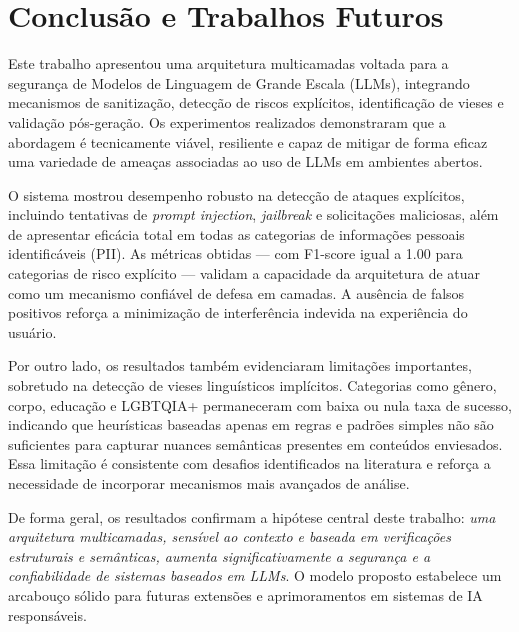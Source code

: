 \section{Conclusão e Trabalhos Futuros}
\label{sec:conclusion}

Este trabalho apresentou uma arquitetura multicamadas voltada para a segurança de Modelos de Linguagem de Grande Escala (LLMs), integrando mecanismos de sanitização, detecção de riscos explícitos, identificação de vieses e validação pós-geração. Os experimentos realizados demonstraram que a abordagem é tecnicamente viável, resiliente e capaz de mitigar de forma eficaz uma variedade de ameaças associadas ao uso de LLMs em ambientes abertos.

O sistema mostrou desempenho robusto na detecção de ataques explícitos, incluindo tentativas de \textit{prompt injection}, \textit{jailbreak} e solicitações maliciosas, além de apresentar eficácia total em todas as categorias de informações pessoais identificáveis (PII). As métricas obtidas — com F1-score igual a 1.00 para categorias de risco explícito — validam a capacidade da arquitetura de atuar como um mecanismo confiável de defesa em camadas. A ausência de falsos positivos reforça a minimização de interferência indevida na experiência do usuário.

Por outro lado, os resultados também evidenciaram limitações importantes, sobretudo na detecção de vieses linguísticos implícitos. Categorias como gênero, corpo, educação e LGBTQIA+ permaneceram com baixa ou nula taxa de sucesso, indicando que heurísticas baseadas apenas em regras e padrões simples não são suficientes para capturar nuances semânticas presentes em conteúdos enviesados. Essa limitação é consistente com desafios identificados na literatura e reforça a necessidade de incorporar mecanismos mais avançados de análise.

De forma geral, os resultados confirmam a hipótese central deste trabalho: \textit{uma arquitetura multicamadas, sensível ao contexto e baseada em verificações estruturais e semânticas, aumenta significativamente a segurança e a confiabilidade de sistemas baseados em LLMs}. O modelo proposto estabelece um arcabouço sólido para futuras extensões e aprimoramentos em sistemas de IA responsáveis.
